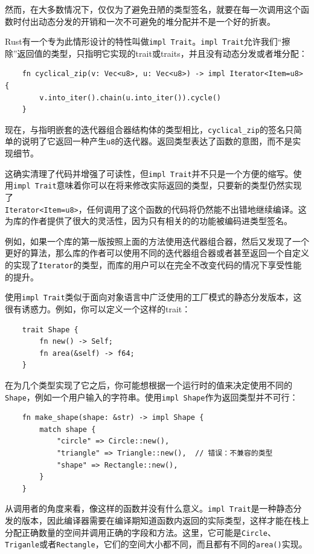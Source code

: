 然而，在大多数情况下，仅仅为了避免丑陋的类型签名，就要在每一次调用这个函数时付出动态分发的开销和一次不可避免的堆分配并不是一个好的折衷。

Rust有一个专为此情形设计的特性叫做\texttt{impl Trait}。\texttt{impl Trait}允许我们“擦除”返回值的类型，只指明它实现的trait或traits，并且没有动态分发或者堆分配：
\begin{verbatim}
    fn cyclical_zip(v: Vec<u8>, u: Vec<u8>) -> impl Iterator<Item=u8> {
        v.into_iter().chain(u.into_iter()).cycle()
    }
\end{verbatim}

现在，与指明嵌套的迭代器组合器结构体的类型相比，\texttt{cyclical\_zip}的签名只简单的说明了它返回一种产生\texttt{u8}的迭代器。返回类型表达了函数的意图，而不是实现细节。

这确实清理了代码并增强了可读性，但\texttt{impl Trait}并不只是一个方便的缩写。使用\texttt{impl Trait}意味着你可以在将来修改实际返回的类型，只要新的类型仍然实现了\\
\texttt{Iterator<Item=u8>}，任何调用了这个函数的代码将仍然能不出错地继续编译。这为库的作者提供了很大的灵活性，因为只有相关的的功能被编码进类型签名。

例如，如果一个库的第一版按照上面的方法使用迭代器组合器，然后又发现了一个更好的算法，那么库的作者可以使用不同的迭代器组合器或者甚至返回一个自定义的实现了\texttt{Iterator}的类型，而库的用户可以在完全不改变代码的情况下享受性能的提升。

使用\texttt{impl Trait}类似于面向对象语言中广泛使用的工厂模式的静态分发版本，这很有诱惑力。例如，你可以定义一个这样的trait：
\begin{verbatim}
    trait Shape {
        fn new() -> Self;
        fn area(&self) -> f64;
    }
\end{verbatim}

在为几个类型实现了它之后，你可能想根据一个运行时的值来决定使用不同的\texttt{Shape}，例如一个用户输入的字符串。使用\texttt{impl Shape}作为返回类型并不可行：
\begin{verbatim}
    fn make_shape(shape: &str) -> impl Shape {
        match shape {
            "circle" => Circle::new(),
            "triangle" => Triangle::new(),  // 错误：不兼容的类型
            "shape" => Rectangle::new(),
        }
    }
\end{verbatim}

从调用者的角度来看，像这样的函数并没有什么意义。\texttt{impl Trait}是一种静态分发的版本，因此编译器需要在编译期知道函数内返回的实际类型，这样才能在栈上分配正确数量的空间并调用正确的字段和方法。这里，它可能是\texttt{Circle}、\texttt{Triganle}或者\texttt{Rectangle}，它们的空间大小都不同，而且都有不同的\texttt{area()}实现。

